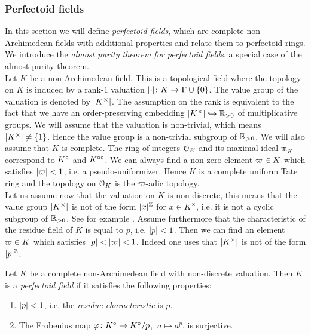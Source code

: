\subsubsection{Perfectoid fields}
In this section we will define \emph{perfectoid fields}, which are complete non-Archimedean fields with additional properties and relate them to perfectoid rings. We introduce the
\emph{almost purity theorem for perfectoid fields}, a special case of the almost purity theorem.\\

Let $K$ be a non-Archimedean field. This is a topological field where the topology on $K$ is induced by a rank-$1$ valuation
$\lvert\cdot\rvert\colon K\to\Gamma\cup\{0\}$. The value group of the valuation is denoted by $\lvert K^\times\rvert$.
The assumption on the rank is equivalent to the fact that we have an order-preserving embedding 
$\lvert K^\times\rvert\hookrightarrow\mathbb{R}_{>0}$ of multiplicative groups. We will assume that the valuation is non-trivial, which means $\lvert K^\times\rvert\neq\{1\}$. Hence the value group is a non-trivial subgroup of $\mathbb{R}_{>0}$.
We will also assume that $K$ is complete.
The ring of integers $\mathcal{O}_K$ and its maximal ideal $\mathfrak{m}_K$ correspond to $K{^{\circ}}$ and $K^{\circ\circ}$. We can always find a non-zero element $\varpi\in K$ which satisfies $\lvert\varpi\rvert<1$, i.e. a pseudo-uniformizer. Hence
$K$ is a complete uniform Tate ring and the topology on $\mathcal{O}_K$ is the $\varpi$-adic topology.\\

Let us assume now that the valuation on $K$ is non-discrete, this means that the value group 
$\lvert K^\times\rvert$ is not of the form $\lvert x\rvert^{\mathbb{Z}}$ for $x\in K^\times$, i.e. it is not a cyclic subgroup of $\mathbb{R}_{>0}$.
See for example \cite[section 1.6]{BGR84}.
Assume furthermore that the characteristic of the residue field of $K$ is equal to $p$, i.e. $\lvert p\rvert<1$.
Then we can find an element  $\varpi\in K$ which satisfies $\lvert p\rvert<\lvert\varpi\rvert<1$.
Indeed one uses that $\lvert K^\times\rvert$ is not of the form $\lvert p\rvert^{\mathbb{Z}}$.




\begin{definition}
Let $K$ be a complete non-Archimedean field with non-discrete valuation. Then $K$ is a \emph{perfectoid field} if it satisfies the following properties:
\begin{enumerate}
\item $\lvert p\rvert<1$, i.e. the \emph{residue characteristic} is $p$.
\item The Frobenius map $\varphi\colon K{^{\circ}}\to K{^{\circ}}/p$, $\:a\mapsto a^p$, is surjective.
\end{enumerate}
\end{definition}



